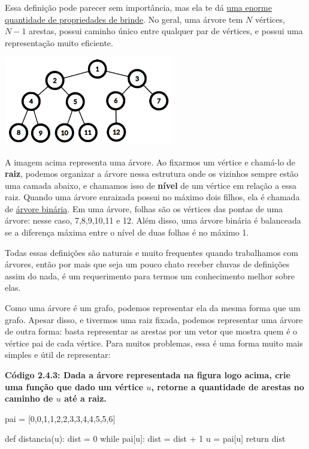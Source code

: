 \documentclass[11pt, a4paper]{article}
\begin{document}
Essa definição pode parecer sem importância, mas ela te dá \href{https://en.wikipedia.org/wiki/Tree_(abstract_data_type)}{uma enorme quantidade de propriedades de brinde}. No geral, uma árvore tem \(N\) vértices, \(N-1\) arestas, possui caminho único entre qualquer par de vértices, e possui uma representação muito eficiente.

\begin{center}
\includegraphics[width=20em]{Imagens/binarytree.png}
\end{center}

A imagem acima representa uma árvore. Ao fixarmos um vértice e chamá-lo de \textbf{raiz}, podemos organizar a árvore nessa estrutura onde os vizinhos sempre estão uma camada abaixo, e chamamos isso de \textbf{nível} de um vértice em relação a essa raiz. Quando uma árvore enraizada possui no máximo dois filhos, ela é chamada de \href{https://en.wikipedia.org/wiki/Binary_tree}{árvore binária}. Em uma árvore, folhas são os vértices das pontas de uma árvore: nesse caso, 7,8,9,10,11 e 12. Além disso, uma árvore binária é balanceada se a diferença máxima entre o nível de duas folhas é no máximo 1.

Todas essas definições são naturais e muito frequentes quando trabalhamos com árvores, então por mais que seja um pouco chato receber chuvas de definições assim do nada, é um requerimento para termos um conhecimento melhor sobre elas.

Como uma árvore é um grafo, podemos representar ela da mesma forma que um grafo. Apesar disso, e tivermos uma raiz fixada, podemos representar uma árvore de outra forma: basta representar as arestas por um vetor que mostra quem é o vértice pai de cada vértice. Para muitos problemas, essa é uma forma muito mais simples e útil de representar:

\label{c2.4.3}
\textbf{Código 2.4.3: Dada a árvore representada na figura logo acima, crie uma função que dado um vértice \(u\), retorne a quantidade de arestas no caminho de \(u\) até a raiz.}

\begin{code}
pai = [0,0,1,1,2,2,3,3,4,4,5,5,6]

def distancia(u):
    dist = 0
    while pai[u]:
        dist = dist + 1
        u = pai[u]
    return dist
\end{code}
\end{document}
